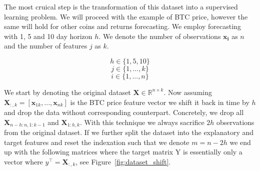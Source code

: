 The most cruical step is the transformation of this dataset into a supervised
learning problem. We will proceed with the example of BTC price, however
the same will hold for other coins and returns forecasting. We employ
forecasting with 1, 5 and 10 day horizon $h$. We denote the number 
of observations $\mathbf{x_{i}}$
as $n$ and the number of features $j$ as $k$.

\begin{equation}\label{eq:horizon}
    h \in \{1,5,10\}
\end{equation}
\begin{equation}\label{eq:features}
    j \in \{1,...,k\}
\end{equation}
\begin{equation}\label{eq:observations}
    i \in \{1,...,n\}
\end{equation}

We start by denoting
the original dataset $\mathbf{X} \in \mathbb{R}^{n \times k}$.
Now assuming $\mathbf{X}_{:,k} = [\mathbf{x}_{1k},...,\mathbf{x}_{nk}]$ 
is the \ac{BTC} price feature vector we shift it
back in time by $h$ and drop the data without corresponding counterpart. 
Concretely, we drop all 
$\mathbf{X}_{n-h:n,1:k-1}$ and $\mathbf{X}_{1:h,k}$.
With this technique we always sacrifice $2h$ observations from the original dataset.
If we further split the dataset into the explanatory and target features
and reset the indexation such that we denote $m = n-2h$
we end up with the following matrices where the target matrix Y is essentially
only a vector where $y^\top = \mathbf{X}_{:,k}$, see Figure~\ref{fig:dataset_shift}.

